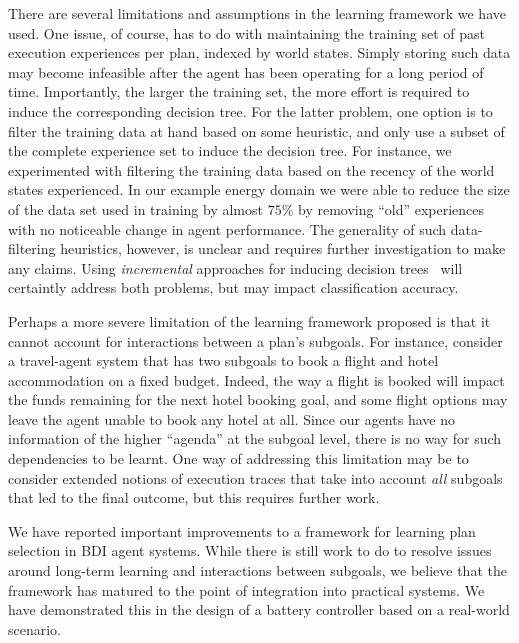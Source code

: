 There are several limitations and assumptions in the learning framework we have used.
One issue, of course, has to do with maintaining the training set of past execution experiences per plan, indexed by world states. Simply storing such data may become infeasible after the agent has been operating for a long period of time. Importantly, the larger the training set, the more effort is required to induce the corresponding decision tree. For the latter problem, one option is to filter the training data at hand based on some heuristic, and only use a subset of the complete experience set to induce the decision tree. For instance, we experimented with filtering the training data based on the recency of the world states experienced. In our example energy domain we were able to reduce the size of the data set used in training by almost $75\%$ by removing ``old'' experiences with no noticeable change in agent performance. The generality of such data-filtering heuristics, however, is unclear and requires further investigation to make any claims. Using \emph{incremental} approaches for inducing decision trees~\cite{Swere06:Fast,Utgoff97Decision} will certaintly address both problems, but may impact classification accuracy.


Perhaps a more severe limitation of the learning framework proposed is that it cannot account for interactions between a plan's subgoals. For instance, consider a travel-agent system that has two subgoals to book a flight and hotel accommodation on a fixed budget. Indeed, the way a flight is booked will impact the funds remaining for the next hotel booking goal, and  some flight options may leave the agent unable to book any hotel at all. Since our agents have no information of the higher ``agenda'' at the subgoal level, there is no way for such dependencies to be learnt. One way of addressing this limitation may be to consider extended notions of execution traces that take into account \emph{all} subgoals that led to the final outcome, but this requires further work.


We have reported important improvements to a framework for learning plan selection in BDI agent systems. While there is still work to do to resolve issues around long-term learning and interactions between subgoals, we believe that the framework has matured to the point of integration into practical systems. We have demonstrated this in the design of a battery controller based on a real-world scenario.




